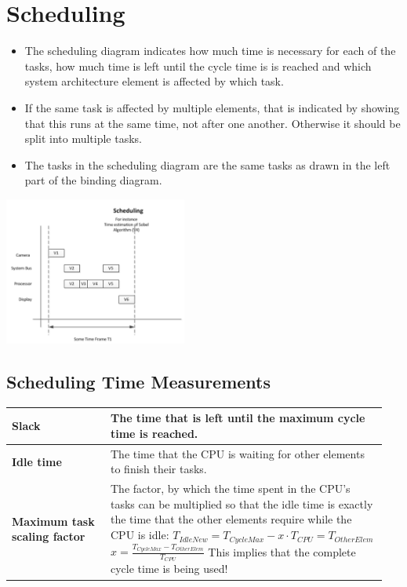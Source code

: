 \section{Scheduling }
	\begin{itemize}
	  \item The scheduling diagram indicates how much time is necessary for each of the tasks, how much time is left until the cycle time is is reached and which system architecture element is affected by which task.
	  \item If the same task is affected by multiple elements, that is indicated by showing that this runs at the same time, not after one another. Otherwise it should be split into multiple tasks.
	  \item The tasks in the scheduling diagram are the same tasks as drawn in the left part of the binding diagram.
	\end{itemize}
	
	\includegraphics[width=0.45\textwidth]{./pictures/scheduling.png}
	
	\subsection{Scheduling Time Measurements}
	\begin{table}[H]\centering
		\begin{tabular}{|p{0.25\linewidth}|p{0.7\linewidth}|}
			\hline
				\textbf{Slack}
					& The time that is left until the maximum cycle time is reached.\\
			\hline
				\textbf{Idle time}
					& The time that the CPU is waiting for other elements to finish their tasks.\\
			\hline
				\textbf{Maximum task scaling factor}
					& The factor, by which the time spent in the CPU's tasks can be multiplied so that the idle time is exactly the time that the other elements require while the CPU is idle: \newline 
					{\Large $T_{IdleNew} = T_{CycleMax} - x \cdot T_{CPU} = T_{OtherElem}$} \newline 
					{\Large $x = \frac{T_{CycleMax} - T_{OtherElem}}{T_{CPU}}$} \newline
					This implies that the complete cycle time is being used!\\
			\hline
		\end{tabular}
	\end{table}
	
